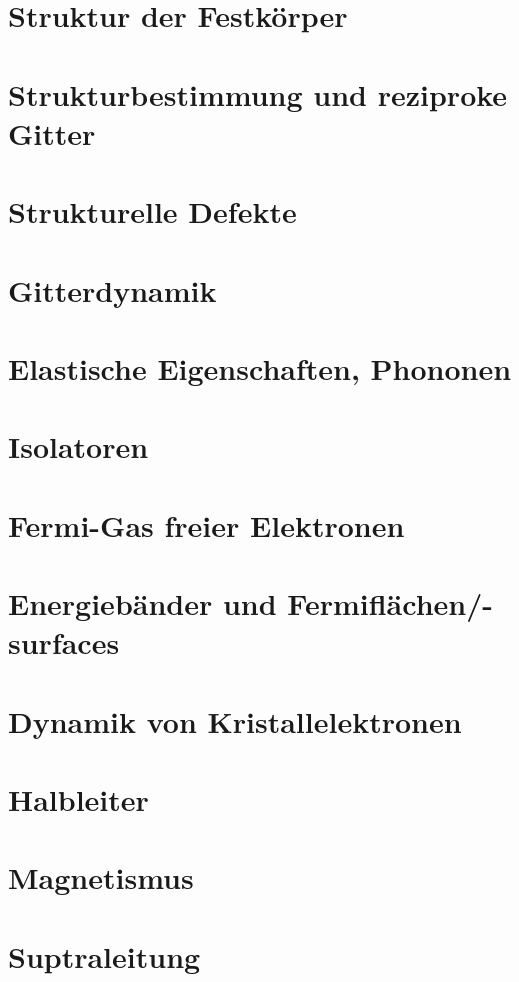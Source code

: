 
\section{Struktur der Festkörper}
\section{Strukturbestimmung und reziproke Gitter}
\section{Strukturelle Defekte}
\section{Gitterdynamik}
\section{Elastische Eigenschaften, Phononen}
\section{Isolatoren}
\section{Fermi-Gas freier Elektronen}
\section{Energiebänder und Fermiflächen/-surfaces}
\section{Dynamik von Kristallelektronen}
\section{Halbleiter}
\section{Magnetismus}
\section{Suptraleitung}